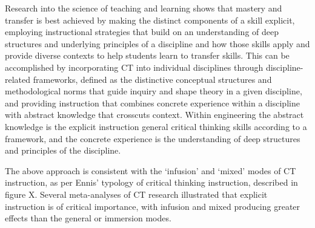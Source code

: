 Research into the science of teaching and learning shows that mastery and transfer is best achieved by making the distinct components of a skill explicit, employing instructional strategies that build on an understanding of deep structures and underlying principles of a discipline and how those skills apply and provide diverse contexts to help students learn to transfer skills. This can be accomplished by incorporating CT into individual disciplines through discipline-related frameworks, defined as the distinctive conceptual structures and methodological norms that guide inquiry and shape theory in a given discipline, and providing instruction that combines concrete experience within a discipline with abstract knowledge that crosscuts context\cite{Ambrose:2010uh}. Within engineering the abstract knowledge is the explicit instruction general critical thinking skills according to a framework, and the concrete experience is the understanding of deep structures and principles of the discipline\cite{Smith:2002df}.  

The above approach is consistent with the ‘infusion’ and ‘mixed’ modes of CT instruction, as per Ennis’ typology of critical thinking instruction, described in figure X.  Several meta-analyses of CT research illustrated that explicit instruction is of critical importance, with infusion and mixed producing greater effects than the general or immersion modes\cite{Abrami:2008td ,Abrami:2014cs,BeharHorenstein:2011tf}.  